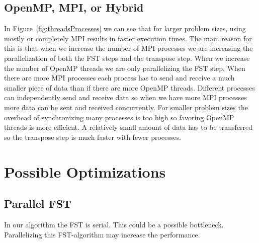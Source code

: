 \documentclass{article}
\begin{document}
\subsection{OpenMP, MPI, or Hybrid}

	In Figure~\ref{fig:threadsProcesses} we can see that for larger problem sizes, using mostly or completely MPI results in faster execution times. The main reason for this is that when we increase the number of MPI processes we are increasing the parallelization of both the FST steps and the transpose step. When we increase the number of OpenMP threads we are only parallelizing the FST step. When there are more MPI processes each process has to send and receive a much smaller piece of data than if there are more OpenMP threads. Different processes can independently send and receive data so when we have more MPI processes more data can be sent and received concurrently. For smaller problem sizes the overhead of synchronizing many processes is too high so favoring OpenMP threads is more efficient. A relatively small amount of data has to be transferred so the transpose step is much faster with fewer processes.





\section{Possible Optimizations}
\subsection{Parallel FST}
In our algorithm the FST is serial. This could be a possible bottleneck. Parallelizing this FST-algorithm may increase the performance.
\end{document}
